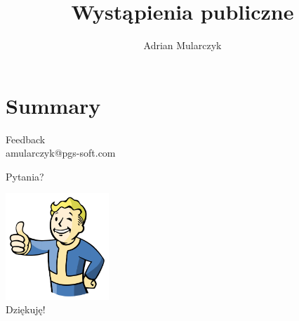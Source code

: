 \documentclass{beamer}
\title[]
{Wystąpienia publiczne}
\author[Adrian Mularczyk]{Adrian Mularczyk}
\institute[PGS Softwarei]
{
PGS Software
}
\date{}
\begin{document}
\begin{frame}
  \titlepage 
\end{frame}


\section{Summary}

\begin{frame}{}
	\begin{center}
		\Huge{Feedback}\\
		\Large{amularczyk@pgs-soft.com}
	\end{center}
\end{frame}

\begin{frame}{Pytania?}
	\begin{center}
  		\includegraphics[height=4cm]{ok.png} \\
		\Huge{Dziękuję!}
	\end{center}
\end{frame}
\end{document}
